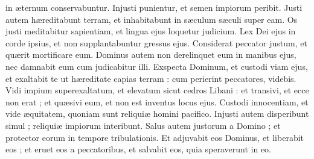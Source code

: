 {in æternum conservabuntur.
Injusti punientur, 
et semen impiorum peribit. \EVERSE
\VERSE Justi autem hæreditabunt terram, et inhabitabunt in sæculum sæculi super eam. \EVERSE
\VERSE Os justi meditabitur sapientiam, et lingua ejus loquetur judicium. \EVERSE
\VERSE Lex Dei ejus in corde ipsius, et non supplantabuntur gressus ejus. \EVERSE
\VERSE Considerat peccator justum, et quærit mortificare eum. \EVERSE
\VERSE Dominus autem non derelinquet eum in manibus ejus, nec damnabit eum cum judicabitur illi. \EVERSE
\VERSE Exspecta Dominum,  et custodi viam ejus, et exaltabit te ut hæreditate capias terram :
cum perierint peccatores,  videbis. \EVERSE
\VERSE Vidi impium superexaltatum, et elevatum sicut cedros Libani : \EVERSE
\VERSE et transivi,  et ecce non erat ; et quæsivi eum,  et non est inventus locus ejus. \EVERSE
\VERSE Custodi innocentiam,  et vide æquitatem, quoniam sunt reliquiæ homini pacifico. \EVERSE
\VERSE Injusti autem disperibunt simul ; reliquiæ impiorum interibunt. \EVERSE
\VERSE Salus autem justorum a Domino ; et protector eorum in tempore tribulationis. \EVERSE
\VERSE Et adjuvabit eos Dominus,  et liberabit eos ; et eruet eos a peccatoribus,  et salvabit eos, 
quia speraverunt in eo.

}
